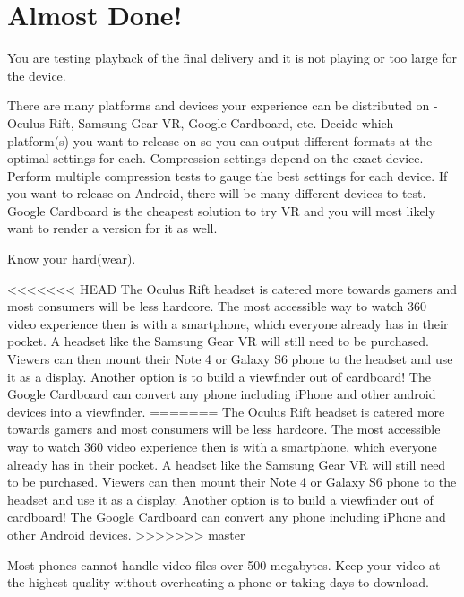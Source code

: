 \chapter{Almost Done!}
\pagecolor{white}
\label{chap:57}
\begin{fullwidth}

\problem

{\large You are testing playback of the final delivery and it is not playing or too large for the device. \par}

There are many platforms and devices your experience can be distributed on - Oculus Rift, Samsung Gear VR, Google Cardboard, etc. Decide which platform(s) you want to release on so you can output different formats at the optimal settings for each. Compression settings depend on the exact device. Perform multiple compression tests to gauge the best settings for each device. If you want to release on Android, there will be many different devices to test. Google Cardboard is the cheapest solution to try VR and you will most likely want to render a version for it as well.

\solutions

{\large Know your hard(wear). \par}

<<<<<<< HEAD
The Oculus Rift headset is catered more towards gamers and most consumers will be less hardcore. The most accessible way to watch 360 video experience then is with a smartphone, which everyone already has in their pocket. A headset like the Samsung Gear VR will still need to be purchased. Viewers can then mount their Note 4 or Galaxy S6 phone to the headset and use it as a display. Another option is to build a viewfinder out of cardboard! The Google Cardboard can convert any phone including iPhone and other android devices into a viewfinder.  
=======
The Oculus Rift headset is catered more towards gamers and most consumers will be less hardcore. The most accessible way to watch 360 video experience then is with a smartphone, which everyone already has in their pocket. A headset like the Samsung Gear VR will still need to be purchased. Viewers can then mount their Note 4 or Galaxy S6 phone to the headset and use it as a display. Another option is to build a viewfinder out of cardboard! The Google Cardboard can convert any phone including iPhone and other Android devices.
>>>>>>> master
 
Most phones cannot handle video files over 500 megabytes. Keep your video at the highest quality without overheating a phone or taking days to download. 


\end{fullwidth}
